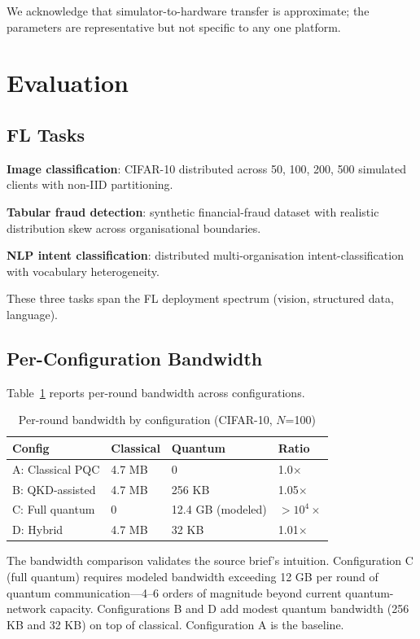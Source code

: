 \documentclass[sigconf,nonacm]{acmart}
\begin{document}
We acknowledge that simulator-to-hardware transfer is approximate;
the parameters are representative but not specific to any one
platform.

\section{Evaluation}

\subsection{FL Tasks}

\textbf{Image classification}: CIFAR-10 distributed across 50,
100, 200, 500 simulated clients with non-IID partitioning.

\textbf{Tabular fraud detection}: synthetic financial-fraud
dataset with realistic distribution skew across organisational
boundaries.

\textbf{NLP intent classification}: distributed multi-organisation
intent-classification with vocabulary heterogeneity.

These three tasks span the FL deployment spectrum (vision,
structured data, language).

\subsection{Per-Configuration Bandwidth}

Table~\ref{tab:bandwidth} reports per-round bandwidth across
configurations.

\begin{table}[h]
\caption{Per-round bandwidth by configuration (CIFAR-10, $N$=100)}
\label{tab:bandwidth}
\small
\begin{tabularx}{\columnwidth}{@{}p{2.6cm}X X X@{}}
\toprule
\textbf{Config} & \textbf{Classical} & \textbf{Quantum} & \textbf{Ratio} \\
\midrule
A: Classical PQC & 4.7 MB     & 0      & 1.0$\times$ \\
B: QKD-assisted  & 4.7 MB     & 256 KB & 1.05$\times$ \\
C: Full quantum  & 0          & 12.4 GB (modeled) & $>10^4\times$ \\
D: Hybrid        & 4.7 MB     & 32 KB  & 1.01$\times$ \\
\bottomrule
\end{tabularx}
\end{table}

The bandwidth comparison validates the source brief's intuition.
Configuration C (full quantum) requires modeled bandwidth
exceeding 12 GB per round of quantum communication---4--6 orders
of magnitude beyond current quantum-network capacity. Configurations
B and D add modest quantum bandwidth (256 KB and 32 KB) on top of
classical. Configuration A is the baseline.
\end{document}
